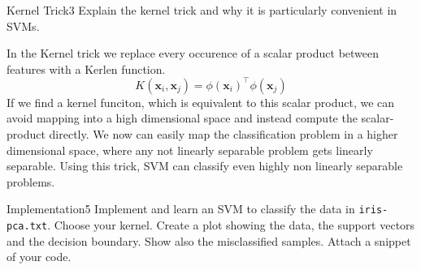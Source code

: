 \begin{questions}
\begin{question}{Kernel Trick}{3}
Explain the kernel trick and why it is particularly convenient in SVMs.
\begin{answer}
In the Kernel trick we replace every occurence of a scalar product between features with a Kerlen function.
\begin{equation}
K(\mathbf{x}_{i}, \mathbf{x}_{j})=\phi(\mathbf{x}_{i})^{\top} \phi(\mathbf{x}_{j})
\end{equation}
If we find a kernel funciton, which is equivalent to this scalar product, we can avoid mapping into a high dimensional space and instead compute the scalar-product directly.
We now can easily map the classification problem in a higher dimensional space, where any not linearly separable problem gets linearly separable.
Using this trick, SVM can classify even highly non linearly separable problems.
\end{answer}
\end{question}


\begin{question}[bonus]{Implementation}{5}
Implement and learn an SVM to classify the data in \texttt{iris-pca.txt}. Choose your kernel. Create a plot showing the data, the support vectors and the decision boundary. Show also the misclassified samples. Attach a snippet of your code.

\begin{answer}\end{answer}

\end{question}

\end{questions}
